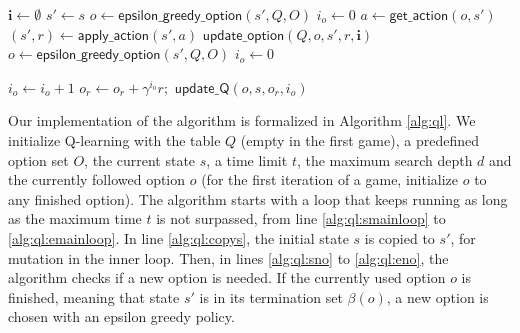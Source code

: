 \begin{algorithm}[h]
	\caption{$\mathsf{SMDP~Q-learning}(Q, O, s, t, d, o)$}
	\label{alg:ql}
	\begin{algorithmic}[1]
		\State $\mathbf{i} \gets \emptyset$ 
		 \label{alg:ql:smainloop}
			\State $s' \gets s$ \label{alg:ql:copys} 
			 \label{alg:ql:sno} 
				\State $o \gets \mathsf{epsilon\_greedy\_option}(s', Q, O)$ 
				\State $i_o \gets 0$ 
			\EndIf \label{alg:ql:eno}
			 \label{alg:ql:sfor}
				\State $a \gets \mathsf{get\_action}(o, s')$ 
				\State $(s', r) \gets \mathsf{apply\_action}(s', a)$ \label{alg:ql:apply}
				\State $\mathsf{update\_option}(Q, o, s', r, \mathbf{i})$ 
					\State $o \gets \mathsf{epsilon\_greedy\_option}(s', Q, O)$ 
					\State $i_o \gets 0$
				\EndIf
			\EndFor \label{alg:ql:efor}
		\EndWhile \label{alg:ql:emainloop}
		\State {}
	\end{algorithmic}
\end{algorithm}
\begin{algorithm}[h]
	\caption{$\mathsf{update\_option}(Q, o, s, r, \mathbf{i})$}
	\label{alg:update}
	\begin{algorithmic}[1]
		\State $i_o \gets i_o + 1$ 
		\State $o_r \gets o_r + \gamma^{i_o} r;$
		 
			\State $\mathsf{update\_Q}(o, s, o_r, i_o)$ 
		\EndIf
	\end{algorithmic}
\end{algorithm}

Our implementation of the algorithm is formalized in Algorithm \ref{alg:ql}. We
initialize Q-learning with the table $Q$ (empty in the first game), a predefined
option set $O$, the current state $s$, a time limit $t$, the maximum search
depth $d$ and the currently followed option $o$ (for the first iteration of a
game, initialize $o$ to any finished option). The algorithm starts with a loop
that keeps running as long as the maximum time $t$ is not surpassed, from line
\ref{alg:ql:smainloop} to \ref{alg:ql:emainloop}. In line \ref{alg:ql:copys},
the initial state $s$ is copied to $s'$, for mutation in the inner loop. Then,
in lines \ref{alg:ql:sno} to \ref{alg:ql:eno}, the algorithm checks if a new
option is needed. If the currently used option $o$ is finished, meaning that
state $s'$ is in its termination set $\beta(o)$, a new option is chosen with an
epsilon greedy policy. 

